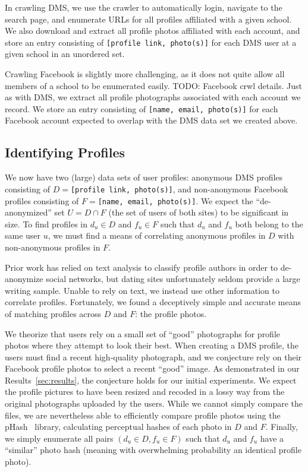 In crawling DMS, we use the crawler to automatically login, navigate to the search page, and enumerate URLs for all profiles affiliated with a given school. We also download and extract all profile photos affiliated with each account, and store an entry consisting of \texttt{[profile link, photo(s)]} for each DMS user at a given school in an unordered set.

Crawling Facebook is slightly more challenging, as it does not quite allow all members of a school to be enumerated easily. TODO: Facebook crwl details.
Just as with DMS, we extract all profile photographs associated with each account we record.
We store an entry consisting of \texttt{[name, email, photo(s)]} for each Facebook account expected to overlap with the DMS data set we created above.

\subsection{Identifying Profiles}
\label{sec:design_profile}

We now have two (large) data sets of user profiles: anonymous DMS profiles consisting of $D = $\texttt{[profile link, photo(s)]}, and non-anonymous Facebook profiles consisting of $F = $\texttt{[name, email, photo(s)]}.
We expect the ``de-anonymized'' set $U = D \cap F$  (the set of users of both sites) to be significant in size.
To find profiles in $d_u \in D$ and $f_u \in F$ such that $d_u$ and $f_u$ both belong to the same user $u$, we must find a means of correlating anonymous profiles in $D$ with non-anonymous profiles in $F$.

Prior work has relied on text analysis to classify profile authors in order to de-anonymize social networks, but dating sites unfortunately seldom provide a large writing sample.
Unable to rely on text, we instead use other information to correlate profiles.
Fortunately, we found a deceptively simple and accurate means of matching profiles across $D$ and $F$: the profile photos.

We theorize that users rely on a small set of ``good'' photographs for profile photos where they attempt to look their best.
When creating a DMS profile, the users must find a recent high-quality photograph, and we conjecture rely on their Facebook profile photos to select a recent ``good'' image.
As demonstrated in our Results~\ref{sec:results}, the conjecture holds for our initial experiments.
We expect the profile pictures to have been resized and recoded in a lossy way from the original photographs uploaded by the users. 
While we cannot simply compare the files, we are nevertheless able to efficiently compare profile photos using the pHash~\cite{phash} library, calculating perceptual hashes of each photo in $D$ and $F$.
Finally, we simply enumerate all pairs $(d_u \in D, f_u \in F)$ such that $d_u$ and $f_u$ have a ``similar'' photo hash (meaning with overwhelming probability an identical profile photo).
